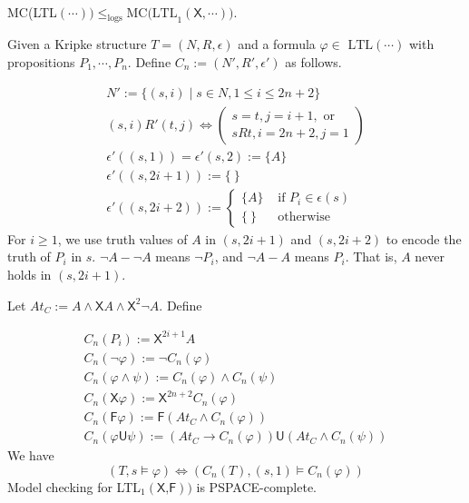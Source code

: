 \documentclass[12pt]{article}
\begin{document}
\ \\

MC(LTL$(\cdots))\leq_{\text{logs}} \mbox{MC(LTL}_1(\textsf{X},\cdots))$. 


Given a Kripke structure $T=(N,R,\epsilon)$ and a formula $\varphi\in \mbox{ LTL}(\cdots)$ with propositions $P_1,\cdots, P_n$. Define $C_n:=(N',R',\epsilon')$ as follows.

$$\begin{array}{l}
N':=\{(s,i)\mid s\in N, 1\leq i\leq 2n+2\}\\

(s,i)R'(t,j) \Longleftrightarrow \left(\begin{array}{l} s=t, j=i+1, \mbox{ or}\\
                                 sRt, i=2n+2, j=1 
\end{array}\right)\\

\epsilon'((s,1))=\epsilon'(s,2):=\{A\}\\

\epsilon'((s,2i+1)):=\{ \ \}\\

\epsilon'((s,2i+2)):=\left\{\begin{array}{ll}
\{A\} & \mbox{ if }P_i\in \epsilon(s)\\
\{\ \} & \mbox{ otherwise }  
\end{array}\right.
\end{array}
$$
%
For $i\geq 1$, we use truth values of $A$ in $(s,2i+1)$ and $(s,2i+2)$ to encode the truth of $P_i$ in $s$. $\neg A-\neg A$ means $\neg P_i$, and $\neg A-A$ means $P_i$. That is, $A$ never holds in $(s,2i+1)$. 

Let $At_C:=A\wedge\textsf{X}A\wedge \textsf{X}^2\neg A$. Define

$$\begin{array}{l}
C_n(P_i):=\textsf{X}^{2i+1}A \\ 
C_n(\neg \varphi):=\neg C_n(\varphi) \\ 
C_n(\varphi\wedge\psi):=C_n(\varphi)\wedge C_n(\psi) \\ 
C_n(\textsf{X}\varphi):=\textsf{X}^{2n+2}C_n(\varphi)\\
C_n(\textsf{F}\varphi):=\textsf{F}(At_C\wedge C_n(\varphi))\\
C_n(\varphi\textsf{U}\psi):=
(At_C\rightarrow C_n(\varphi))\textsf{U}(At_C\wedge C_n(\psi)) 
\end{array}
$$
We have $$ (T,s\models \varphi)\Longleftrightarrow (C_n(T), (s,1)\models C_n(\varphi))$$
%
\color{red}
Model checking for LTL$_1(\textsf{X,F}))$ is PSPACE-complete.
\color{black}
\end{document}
